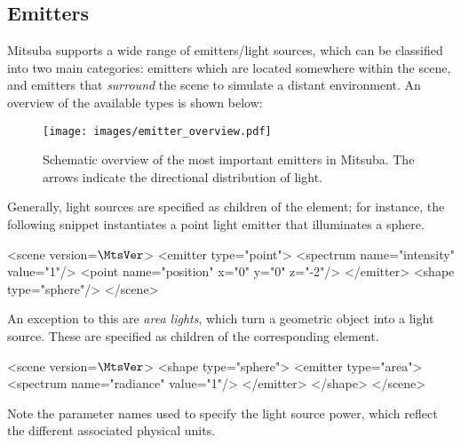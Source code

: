 \newpage
\subsection{Emitters}
\label{sec:emitters}
Mitsuba supports a wide range of emitters/light sources, which can be classified
into two main categories: emitters which are located somewhere within the scene, and emitters
that \emph{surround} the scene to simulate a distant environment. An overview of the available
types is shown below:
\begin{figure}[h!]
\centering
\texttt{[image: images/emitter\_overview.pdf]}
\caption{
    Schematic overview of the most important emitters in Mitsuba.
    The arrows indicate the directional distribution of light.
}
\end{figure}
\newpage
Generally, light sources are specified as children of the  element; for instance,
the following snippet instantiates a point light emitter that illuminates a sphere.
\begin{xml}
<scene version=$\MtsVer$>
    <emitter type="point">
        <spectrum name="intensity" value="1"/>
        <point name="position" x="0" y="0" z="-2"/>
    </emitter>
    <shape type="sphere"/>
</scene>
\end{xml}
An exception to this are \emph{area lights}, which turn a geometric object into a light source.
These are specified as children of the corresponding  element.
\begin{xml}
<scene version=$\MtsVer$>
    <shape type="sphere">
        <emitter type="area">
            <spectrum name="radiance" value="1"/>
        </emitter>
    </shape>
</scene>
\end{xml}
Note the parameter names used to specify the light source power, which reflect
the different associated physical units.
